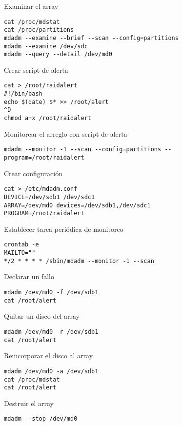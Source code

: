 Examinar el array
\begin{lstlisting}
cat /proc/mdstat
cat /proc/partitions
mdadm --examine --brief --scan --config=partitions
mdadm --examine /dev/sdc
mdadm --query --detail /dev/md0
\end{lstlisting}

Crear script de alerta
\begin{lstlisting}
cat > /root/raidalert
#!/bin/bash
echo $(date) $* >> /root/alert
^D
chmod a+x /root/raidalert
\end{lstlisting}

Monitorear el arreglo con script de alerta
\begin{lstlisting}
mdadm --monitor -1 --scan --config=partitions --program=/root/raidalert
\end{lstlisting}

Crear configuración
\begin{lstlisting}
cat > /etc/mdadm.conf
DEVICE=/dev/sdb1 /dev/sdc1
ARRAY=/dev/md0 devices=/dev/sdb1,/dev/sdc1
PROGRAM=/root/raidalert
\end{lstlisting}

Establecer tarea periódica de monitoreo
\begin{lstlisting}
crontab -e
MAILTO=""
*/2 * * * * /sbin/mdadm --monitor -1 --scan 
\end{lstlisting}

Declarar un fallo
\begin{lstlisting}
mdadm /dev/md0 -f /dev/sdb1
cat /root/alert
\end{lstlisting}

Quitar un disco del array
\begin{lstlisting}
mdadm /dev/md0 -r /dev/sdb1 
cat /root/alert
\end{lstlisting}

Reincorporar el disco al array
\begin{lstlisting}
mdadm /dev/md0 -a /dev/sdb1 
cat /proc/mdstat
cat /root/alert
\end{lstlisting}

Destruir el array
\begin{lstlisting}
mdadm --stop /dev/md0
\end{lstlisting}
